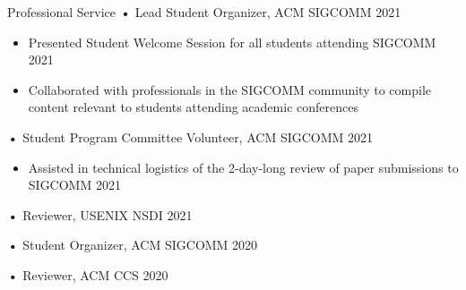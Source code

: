 \documentclass{resume} %
\begin{document}
	\begin{rSection}{Professional Service}
		\textbf{•} Lead Student Organizer, ACM SIGCOMM 2021
		\begin{itemize}
			\item Presented Student Welcome Session for all students attending SIGCOMM 2021
			\item Collaborated with professionals in the SIGCOMM community to compile content relevant to students attending academic conferences
		\end{itemize}
		\textbf{•} Student Program Committee Volunteer, ACM SIGCOMM 2021
		\begin{itemize}
			\item Assisted in technical logistics of the 2-day-long review of paper submissions to SIGCOMM 2021
		\end{itemize}
		
		\textbf{•} Reviewer, USENIX NSDI 2021
		
		\textbf{•} Student Organizer, ACM SIGCOMM 2020
		
		\textbf{•} Reviewer, ACM CCS 2020
		
	\end{rSection}
\end{document}
